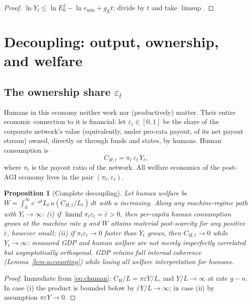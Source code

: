 \documentclass[11pt]{article}
\newtheorem{proposition}{Proposition}
\newcommand{\eps}{\varepsilon}
\begin{document}
\begin{proof}
$\ln Y_t \le \ln E^{f}_0 - \ln e_{\min} + g_E t$; divide by $t$ and take $\limsup$.
\end{proof}

\section{Decoupling: output, ownership, and welfare}\label{sec:decoupling}

\subsection{The ownership share \texorpdfstring{$\eps_t$}{epsilon}}

Humans in this economy neither work nor (productively) matter. Their entire economic connection to it is financial: let $\eps_t \in [0,1]$ be the share of the corporate network's value (equivalently, under pro-rata payout, of its net payout stream) owned, directly or through funds and states, by humans. Human consumption is
\begin{equation}
C_{H,t} = \pi_t\, \eps_t\, Y_t,
\label{eq:chuman}
\end{equation}
where $\pi_t$ is the payout ratio of the network. All welfare economics of the post-AGI economy lives in the pair $(\pi_t, \eps_t)$.

\begin{proposition}[Complete decoupling]\label{prop:decouple}
Let human welfare be $W = \int_0^\infty e^{-\rho t} L_t\, u(C_{H,t}/L_t)\, dt$ with $u$ increasing. Along any machine-regime path with $Y_t \to \infty$: (i) if $\liminf \pi_t \eps_t = \bar\eps > 0$, then per-capita human consumption grows at the machine rate $g$ and $W$ attains material post-scarcity for any positive $\bar\eps$, however small; (ii) if $\pi_t \eps_t \to 0$ faster than $Y_t$ grows, then $C_{H,t} \to 0$ while $Y_t \to \infty$: measured GDP and human welfare are not merely imperfectly correlated but asymptotically orthogonal. GDP retains full internal coherence (Lemma~\ref{lem:accounting}) while losing all welfare interpretation for humans.
\end{proposition}

\begin{proof}
Immediate from \eqref{eq:chuman}: $C_{H}/L = \pi \eps Y / L$, and $Y/L \to \infty$ at rate $g - n$. In case (i) the product is bounded below by $\bar\eps Y/L \to \infty$; in case (ii) by assumption $\pi\eps Y \to 0$.
\end{proof}
\end{document}
